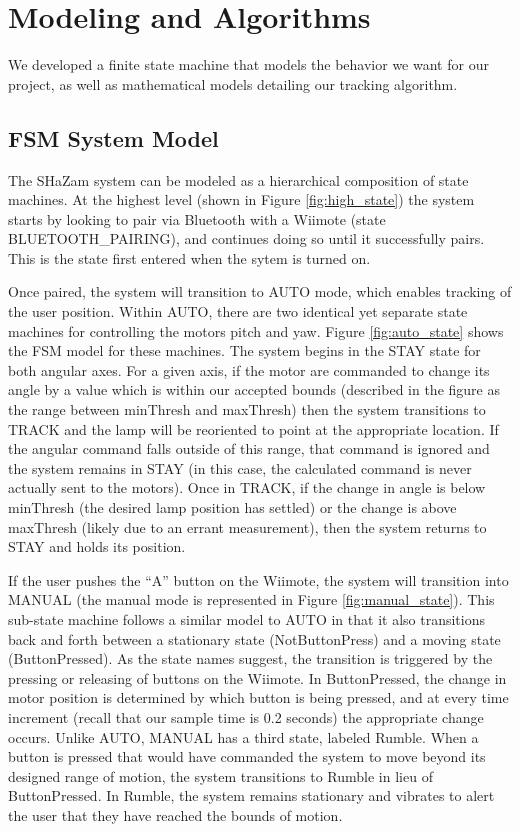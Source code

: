 \documentclass[conference, twocolumn]{IEEEtran}
\begin{document}
\section{Modeling and Algorithms}
\label{sec:algorithms}
We developed a finite state machine that models the behavior we want for our project, as well as mathematical models detailing our tracking algorithm.
 
 \subsection*{FSM System Model}
 The SHaZam system can be modeled as a hierarchical composition of state machines. At the highest level (shown in Figure \ref{fig:high_state}) the system starts by looking to pair via Bluetooth with a Wiimote (state BLUETOOTH\_PAIRING), and continues doing so until it successfully pairs. This is the state first entered when the sytem is turned on.
 
 Once paired, the system will transition to AUTO mode, which enables tracking of the user position. Within AUTO, there are two identical yet separate state machines for controlling the motors pitch and yaw. Figure \ref{fig:auto_state} shows the FSM model for these machines. The system begins in the STAY state for both angular axes. For a given axis, if the motor are commanded to change its angle by a value which is within our accepted bounds (described in the figure as the range between minThresh and maxThresh) then the system transitions to TRACK and the lamp will be reoriented to point at the appropriate location. If the angular command falls outside of this range, that command is ignored and the system remains in STAY (in this case, the calculated command is never actually sent to the motors). Once in TRACK, if the change in angle is below minThresh (the desired lamp position has settled) or the change is above maxThresh (likely due to an errant measurement), then the system returns to STAY and holds its position.
 
If the user pushes the ``A'' button on the Wiimote, the system will transition into MANUAL (the manual mode is represented in Figure \ref{fig:manual_state}). This sub-state machine follows a similar model to AUTO in that it also transitions back and forth between a stationary state (NotButtonPress) and a moving state (ButtonPressed). As the state names suggest, the transition is triggered by the pressing or releasing of buttons on the Wiimote. In ButtonPressed, the change in motor position is determined by which button is being pressed, and at every time increment (recall that our sample time is 0.2 seconds) the appropriate change occurs. Unlike AUTO, MANUAL has a third state, labeled Rumble. When a button is pressed that would have commanded the system to move beyond its designed range of motion, the system transitions to Rumble in lieu of ButtonPressed. In Rumble, the system remains stationary and vibrates to alert the user that they have reached the bounds of motion.
\end{document}
